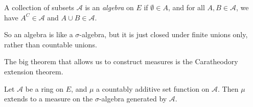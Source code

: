 \documentclass[a4paper]{article}
\begin{document}
\begin{defi}[Algebra]
  A collection of subsets $\mathcal{A}$ is an \emph{algebra} on $E$ if $\emptyset \in A$, and for all $A, B \in \mathcal{A}$, we have $A^C \in \mathcal{A}$ and $A \cup B \in \mathcal{A}$.
\end{defi}
So an algebra is like a $\sigma$-algebra, but it is just closed under finite unions only, rather than countable unions.

The big theorem that allows us to construct measures is the Caratheodory extension theorem.
\begin{thm}
  Let $\mathcal{A}$ be a ring on $E$, and $\mu$ a countably additive set function on $\mathcal{A}$. Then $\mu$ extends to a measure on the $\sigma$-algebra generated by $\mathcal{A}$.
\end{thm}
\end{document}
